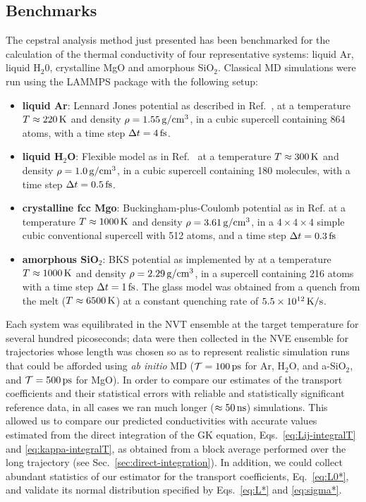 \subsection{Benchmarks}  \label{sec:cepstral-benchmarks}
The cepstral analysis method just presented has been benchmarked for the calculation of the thermal conductivity of four representative systems: liquid Ar, liquid H$_2$0, crystalline MgO and amorphous SiO$_2$.
Classical MD simulations were run using the LAMMPS package \cite{LAMMPS1995} with the following setup:
\begin{itemize}
    \item \textbf{liquid Ar}: Lennard Jones potential as described in Ref.~\cite{Argon-FF}, at a temperature $T\approx 220\,\mathrm{K}$ and density $\rho=1.55\,\mathrm{g/cm^3}$, in a cubic supercell containing 864 atoms, with a time step $\Delta t=4\,\mathrm{fs}$.
    \item \textbf{liquid H$_2$O}: Flexible model as in Ref.~\cite{Water-FF} at a temperature $T\approx 300\,\mathrm{K}$ and density $\rho=1.0\,\mathrm{g/cm^3}$, in a cubic supercell containing 180 molecules, with a time step $\Delta t=0.5\,\mathrm{fs}$.
    \item \textbf{crystalline fcc Mgo}: Buckingham-plus-Coulomb potential as in Ref.  at a temperature $T\approx 1000\,\mathrm{K}$ and density $\rho=3.61\,\mathrm{g/cm^3}$, in a $4\times 4\times 4$ simple cubic conventional supercell with 512 atoms, and a time step $\Delta t=0.3\,\mathrm{fs}$
    \item \textbf{amorphous SiO$_2$}: BKS potential \cite{Silica-BKS-1990} as implemented by \citet{Silica-BKS-2015} at a temperature $T\approx 1000\,\mathrm{K}$ and density $\rho=2.29\,\mathrm{g/cm^3}$,  in a supercell containing 216 atoms with a time step $\Delta t=1\,\mathrm{fs}$. The glass model was obtained from a quench from the melt ($T\approx 6500\,\mathrm{K}$) at a constant quenching rate of $5.5\times 10^{12}\,\mathrm{K/s}$.
\end{itemize}
Each system was equilibrated in the NVT ensemble at the target temperature for several hundred picoseconds; data were then collected in the NVE ensemble for trajectories whose length was chosen so as to represent realistic simulation runs that could be afforded using \emph{ab initio} MD ($\mathcal{T} = 100\,\mathrm{ps}$ for Ar, H$_2$O, and a-SiO$_2$, and $\mathcal{T} =500\,\mathrm{ps}$ for MgO). 
In order to compare our estimates of the transport coefficients and their statistical errors with reliable and statistically significant reference data, in all cases we ran much longer ($\approx 50\,\mathrm{ns}$) simulations. 
This allowed us to compare our predicted conductivities with accurate values estimated from the direct integration of the GK equation, Eqs.~\eqref{eq:Lij-integralT} and \eqref{eq:kappa-integralT}, as obtained from a block average \cite{Frenkel2001} performed over the long trajectory (see Sec.~\ref{sec:direct-integration}). 
In addition, we could collect abundant statistics of our estimator for the transport coefficients, Eq.~\eqref{eq:L0*}, and validate its normal distribution specified by Eqs.~\eqref{eq:L*} and \eqref{eq:sigma*}. 

